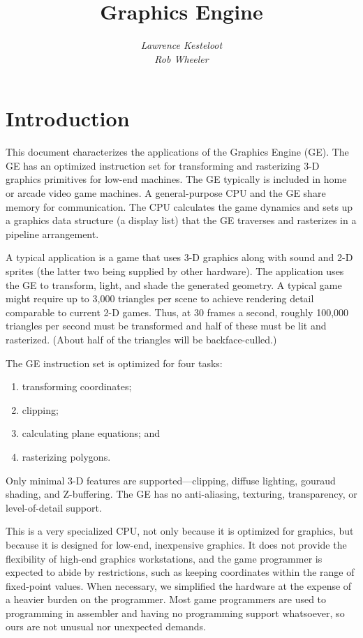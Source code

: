 \documentclass{article}
\title{Graphics Engine}
\author{\it Lawrence Kesteloot\\\it Rob Wheeler}
\begin{document}
\maketitle

\newenvironment{indented}[1]{\vspace{2ex}\noindent{\bf #1}\begin{list}{}{\setlength{\topsep}{0em}}\item}{\end{list}}

\section{Introduction}
This document characterizes the applications of the Graphics Engine (GE).
The GE has an optimized instruction set for transforming and rasterizing 3-D
graphics primitives for low-end machines.  The GE typically is
included in home or arcade video game machines.  A general-purpose CPU
and the GE share memory for communication.  The CPU calculates the
game dynamics and sets up a graphics data structure (a display list)
that the GE traverses and rasterizes in a pipeline arrangement.

A typical application is a game that uses 3-D graphics along with
sound and 2-D sprites (the latter two being supplied by other
hardware).  The application uses the GE to transform, light, and shade
the generated geometry.  A typical game might require up to
3,000 triangles per scene to achieve rendering detail comparable to
current 2-D games.  Thus, at 30 frames a second, roughly 100,000
triangles per second must be transformed and half of these must be lit
and rasterized.  (About half of the triangles will be backface-culled.)

The GE instruction set is optimized for four tasks:
\begin{enumerate}
\item transforming coordinates;
\item clipping;
\item calculating plane equations; and
\item rasterizing polygons.
\end{enumerate}
Only minimal 3-D features are supported---clipping,
diffuse lighting, gouraud shading, and Z-buffering.  The GE has no
anti-aliasing, texturing, transparency, or level-of-detail support.

This is a very specialized CPU, not only because it is optimized
for graphics, but because it is designed for low-end, inexpensive
graphics.  It does not provide the flexibility of high-end graphics
workstations, and the game programmer is expected to abide by
restrictions, such as keeping coordinates within the range of
fixed-point values.  When necessary, we simplified the hardware at the
expense of a heavier burden on the programmer.  Most game programmers
are used to programming in assembler and having no programming support
whatsoever, so ours are not unusual nor unexpected demands.
\end{document}
